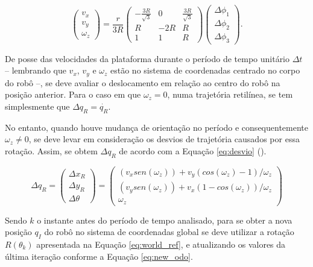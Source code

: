 \begin{equation}
  \begin{pmatrix}
    v_x \\
    v_y \\
    \omega_z
  \end{pmatrix}
  =
  \frac{r}{3R}
  \begin{pmatrix}
    -\frac{3R}{\sqrt{3}} & 0   & \frac{3R}{\sqrt{3}} \\
    R                    & -2R & R                   \\
    1                    & 1   & R
  \end{pmatrix}
  \begin{pmatrix}
    \Delta{\phi_1} \\
    \Delta{\phi_2} \\
    \Delta{\phi_3}
  \end{pmatrix}.
  \label{eq:odo}
\end{equation}

De posse das velocidades da plataforma durante o período de tempo unitário $\Delta t$ -- lembrando que $v_x$, $v_y$ e $\omega_z$ estão no sistema de coordenadas centrado no corpo do robô --, se deve avaliar o deslocamento em relação ao centro do robô na posição anterior. Para o caso em que $\omega_z = 0$, numa trajetória retilínea, se tem simplesmente que $\Delta q_R = \dot{q_R}$.

No entanto, quando houve mudança de orientação no período e consequentemente $\omega_z \neq 0$, se deve levar em consideração os desvios de trajetória causados por essa rotação. Assim, se obtem $\Delta q_R$ de acordo com a Equação \ref{eq:desvio} (\cite{lynch2017modern}).

\begin{equation}
  \Delta q_R
  =
  \begin{pmatrix}
    \Delta x_R \\
    \Delta y_R \\
    \Delta\theta
  \end{pmatrix}
  =
  \begin{pmatrix}
    (v_x sen(\omega_z)) + v_y (cos(\omega_z) - 1)/\omega_z \\
    (v_y sen(\omega_z)) + v_x (1-cos(\omega_z)) / \omega_z \\
    \omega_z
  \end{pmatrix}
  \label{eq:desvio}
\end{equation}

Sendo $k$ o instante antes do período de tempo analisado, para se obter a nova posição $q_I$ do robô no sistema de coordenadas global se deve utilizar a rotação $R(\theta_k)$ apresentada na Equação \ref{eq:world_ref}, e atualizando os valores da última iteração conforme a Equação \ref{eq:new_odo}.

